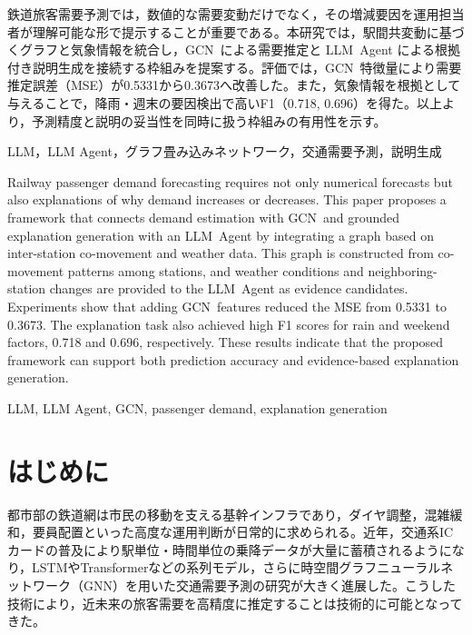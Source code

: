 \documentclass[technicalreport]{ieicej}
\newcommand{\LLM}{LLM}
\newcommand{\GCN}{GCN}
\begin{document}
\begin{jabstract}
鉄道旅客需要予測では，数値的な需要変動だけでなく，その増減要因を運用担当者が理解可能な形で提示することが重要である。本研究では，駅間共変動に基づくグラフと気象情報を統合し，\GCN\ による需要推定と \LLM\ Agent による根拠付き説明生成を接続する枠組みを提案する。評価では，\GCN\ 特徴量により需要推定誤差（MSE）が0.5331から0.3673へ改善した。また，気象情報を根拠として与えることで，降雨・週末の要因検出で高いF1（0.718, 0.696）を得た。以上より，予測精度と説明の妥当性を同時に扱う枠組みの有用性を示す。
\end{jabstract}

\begin{jkeyword}
LLM，LLM Agent，グラフ畳み込みネットワーク，交通需要予測，説明生成
\end{jkeyword}

\begin{eabstract}
Railway passenger demand forecasting requires not only numerical forecasts but also explanations of why demand increases or decreases. This paper proposes a framework that connects demand estimation with \GCN\ and grounded explanation generation with an \LLM\ Agent by integrating a graph based on inter-station co-movement and weather data. This graph is constructed from co-movement patterns among stations, and weather conditions and neighboring-station changes are provided to the \LLM\ Agent as evidence candidates. Experiments show that adding \GCN\ features reduced the MSE from 0.5331 to 0.3673. The explanation task also achieved high F1 scores for rain and weekend factors, 0.718 and 0.696, respectively. These results indicate that the proposed framework can support both prediction accuracy and evidence-based explanation generation.
\end{eabstract}

\begin{ekeyword}
LLM, LLM Agent, GCN, passenger demand, explanation generation
\end{ekeyword}

\maketitle

\section{はじめに}
都市部の鉄道網は市民の移動を支える基幹インフラであり，ダイヤ調整，混雑緩和，要員配置といった高度な運用判断が日常的に求められる。近年，交通系ICカードの普及により駅単位・時間単位の乗降データが大量に蓄積されるようになり，LSTMやTransformerなどの系列モデル，さらに時空間グラフニューラルネットワーク（GNN）を用いた交通需要予測の研究が大きく進展した\cite{7508408,vaswani2017attention,10.5555/3304222.3304273}。こうした技術により，近未来の旅客需要を高精度に推定することは技術的に可能となってきた。
\end{document}
